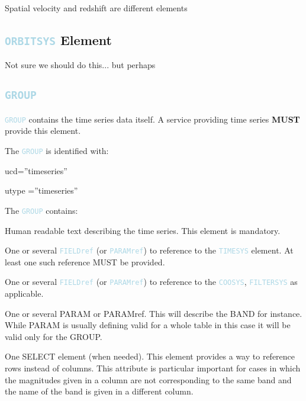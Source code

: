 \documentclass[11pt,a4paper]{ivoa}
\newcommand\elem[1]{\textcolor{LightBlue}{{\tt#1}}}
\begin{document}
Spatial velocity and redshift are different elements

\subsection{\elem{ORBITSYS} Element}
Not sure we should do this... but perhaps

\subsection{\elem{GROUP}}
\elem{GROUP} contains the time series data itself. A service providing time series \textbf{MUST} provide this element.

The \elem{GROUP} is identified with:
\begin{description}
\item ucd=''timeseries'' 
\item utype =''timeseries'' 
\end{description}

The \elem{GROUP} contains:
\begin{description}
     \item[\elem{DESCRIPTION}] Human readable text describing the time series. This element is mandatory. 
     \item[\elem{FIELDref}] One or several \elem{FIELDref} (or \elem{PARAMref}) to reference to the \elem{TIMESYS} element. At least one such reference MUST be provided.
     \item[\elem{FIELDref}] One or several \elem{FIELDref} (or \elem{PARAMref}) to reference to the \elem{COOSYS}, \elem{FILTERSYS} as applicable. 
     \item One or several PARAM or PARAMref. This will describe the BAND for instance. While PARAM is usually defining valid for a whole table in this case it will be valid only for the GROUP.  
     \item One SELECT element (when needed). This element provides a way to reference rows instead of columns. This attribute is particular important for cases in which the magnitudes given in a column are not corresponding to the same band and the name of the band is given in a different column. 
\end{description}
\end{document}
